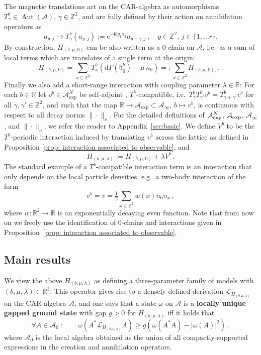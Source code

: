 \documentclass[a4paper]{article}
\DeclareMathOperator{\aut}{Aut}
\newcommand{\fd}{r}
\newcommand{\w}{\omega}
\newcommand{\Z}{\mathbb{Z}}
\newcommand{\mA}{\mathcal{A}}
\newcommand{\R}{\mathbb{R}}
\newcommand{\mL}{\mathcal{L}}
\theoremstyle{plain}
\theoremstyle{definition}
\theoremstyle{remark}
\renewcommand{\(}{\left(}
\renewcommand{\)}{\right)}
\begin{document}
The magnetic translations act on the CAR-algebra as automorphisms $T^b_\gamma \in \aut(\mathcal{A})$, $\gamma \in \Z^2$, and are  fully defined by their action on annihilation operators as
\begin{equation}\label{magtrans}
a_{y,j}\mapsto T^b_\gamma(a_{y,j}) :=  \mathrm{e}^{-\mathrm{i}b y_1 \gamma_2} a_{y+\gamma,j} \,,\quad y\in\Z^2, \, j\in \{1,\dots\fd\}.
\end{equation}
By construction, $H_{(b,\mu,0)}$ can be also written as a 0-chain  on $\mathcal{A}$, i.e.\  as a sum of local terms which are translates of a single term at the origin:
\[
H_{(b,\mu,0)} = \sum_{x\in\Z^2} T^b_x ( \mathrm{d}\Gamma(\mathfrak{h}^b_0) - \mu\, n_0) =: \sum_{x\in\Z^2} H_{(b,\mu,0),x} \,.
\]
Finally we also add a  short-range interaction  with coupling parameter $\lambda\in\R$: For each $b\in \R$ let 
$v^b \in\mA^N_{\exp}$ be self-adjoint ,   $T^b$-compatible, i.e.\ $T^b_\gamma T^b_{\gamma'} v^b = T^b_{\gamma+ \gamma'} v^b $ for all $\gamma,\gamma'\in\Z^2$, and such that the map   $\R\to \mA_{\exp}\subset\mA_\infty$, $b\mapsto v^b$, is continuous  with respect to all decay norms $\|\cdot\|_\nu$.  
For the detailed definitions of  $\mathcal{A}_{\rm exp}^{N}$, $\mathcal{A}_{\rm exp}$, $\mathcal{A}_{\infty}$, and $\|\cdot\|_{\nu}$, we refer the reader to Appendix~\ref{sec:basic}.
 We define $V^b$ to be the $T^b$-periodic interaction induced by translating $v^b$ across the lattice as defined in Proposition \ref{prop: interaction associated to observable},
and
\[
H_{(b,\mu,\lambda)} := H_{(b,\mu,0)} + \lambda V^b\,.
\] 
The standard example of a $T^b$-compatible interaction term is an interaction that only depends on the local particle densities, e.g.\ a two-body interaction of the form
\[
v^b = v = \tfrac{1}{2}\sum_{x\in\Z^2} w(x) n_0 n_x\,,
\]
where $w:\R^2\to\R$ is an exponentially decaying even function.
Note that from now on we freely use the identification of  $0$-chains and interactions given in Proposition~\ref{prop: interaction associated to observable}. 





\subsection{Main results}

We view the above $H_{(b,\mu,\lambda)}$ as defining a three-parameter family of models with $(b,\mu,\lambda)\in \R^3$. This operator gives rise to a densely defined derivation $\mL_{H_{(b,\mu,\lambda)}}$ on the CAR-algebra $\mA$, and one says that a state $\w$ on $\mA$ is a \textbf{locally unique gapped ground state} with gap $g>0$ for $H_{(b,\mu,\lambda)}$ iff it holds that
\[
\forall A \in \mA_{0}\;:\qquad
\w(A^* \mL_{H_{(b,\mu,\lambda)}}A)
\geq g\left(\w(A^*A)- |\w(A)|^2
\right) \,, 
\]
 where  $\mA_0$  is  the local algebra obtained as the union of all compactly-supported expressions in the creation and annihilation operators.
\end{document}

